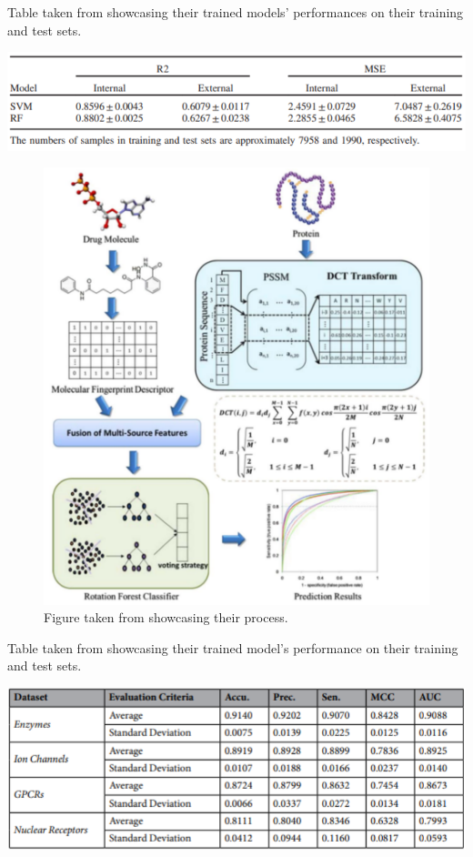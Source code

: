 \pagebreak

\begin{table}[!ht]
  \caption{Table taken from \citet{Shar2016} showcasing their trained models' performances on their training and test sets.}
  \label{tbl:Shar_Model_Performance}
  \includegraphics[width=1.0\linewidth]{images/Shar_Model_Performance.pdf}
\end{table}

\begin{figure}[!ht]
    \centering
    \includegraphics[width=0.7\linewidth]{images/Wang_Process.pdf}    
    \caption{Figure taken from \citet{Wang2020} showcasing their process.}
    \label{fig:Wang_Process} 
\end{figure}

\begin{table}[!ht]
  \caption{Table taken from \citet{Wang2020} showcasing their trained model's performance on their training and test sets.}
  \label{tbl:Wang_Model_Performance}
  \includegraphics[width=0.95\linewidth]{images/Wang_Model_Performance.pdf}
\end{table}

